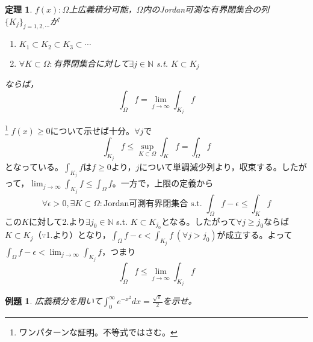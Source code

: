 \documentclass[dvipdfmx,a4j,10pt]{jsarticle}
\makeatletter
\theoremstyle{mystyle1}
\newtheorem{thm}[dfn]{定理}
\theoremstyle{mystyle2}
\newtheorem{ex}{例題}
\renewenvironment{proof}[1][\proofname]{\par
  \pushQED{\qed}%
  \normalfont
  \topsep6\p@\@plus6\p@ \trivlist
  \item[\hskip\labelsep{\bfseries\sffamily #1}]\ignorespaces
}{%
  \popQED\endtrivlist\@endpefalse
}
\renewcommand\proofname{証明}
\makeatother
\begin{document}


\newpage

\begin{framed}
	\begin{thm}\label{th3.14}
		$f(x):\Omega$上広義積分可能，$\Omega$内のJordan可測な有界閉集合の列$\{K_j\}_{j=1,2,\cdots}$が
		\begin{enumerate}
			\item $K_1\subset K_2\subset K_3\subset \cdots$
			\item $\forall K\subset\Omega:$有界閉集合に対して$\exists j\in \mathbb{N}$ s.t. $K\subset K_j$
		\end{enumerate}
		ならば，
		\[
			\int_\Omega f = \lim_{j\to\infty}\int_{K_j} f
		\]
	\end{thm}
\end{framed}

\begin{proof}\footnote{ワンパターンな証明。不等式ではさむ。}
	$f(x)\geq 0$について示せば十分。$\forall j$で
	\[
		\int_{K_j} f\leq \sup_{K\subset\Omega}\int_K f = \int_\Omega f
	\]
	となっている。$\displaystyle\int_{K_j} f$は$f\geq 0$より，$j$について単調減少列より，収束する。したがって，$\displaystyle\lim_{j\to\infty}\int_{K_j}f\leq\int_{\Omega} f$。一方で，上限の定義から
	\[
		\forall\epsilon>0,\exists K\subset\Omega:\textrm{Jordan可測有界閉集合\ s.t.\ }\int_\Omega f-\epsilon \leq \int_K f
	\]
	この$K$に対して2.より$\exists j_0\in\mathbb{N}$ s.t. $K\subset K_{j_0}$となる。したがって$\forall j\geq j_0$ならば$K\subset K_j$（$\because$1.より）となり，$\displaystyle\int_\Omega f-\epsilon < \int_{K_j} f\ (\forall j> j_0)$が成立する。よって$\displaystyle\int_\Omega f-\epsilon < \lim_{j\to\infty}\int_{K_j}f$，つまり
	\[
	\int_\Omega f\leq \lim_{j\to\infty}\int_{K_j}f
	\]
\end{proof}

\newpage

\begin{ex}
広義積分を用いて$\displaystyle\int_0^\infty e^{-x^2}dx=\frac{\sqrt{\pi}}{2}$を示せ。
\end{ex}
\end{document}

